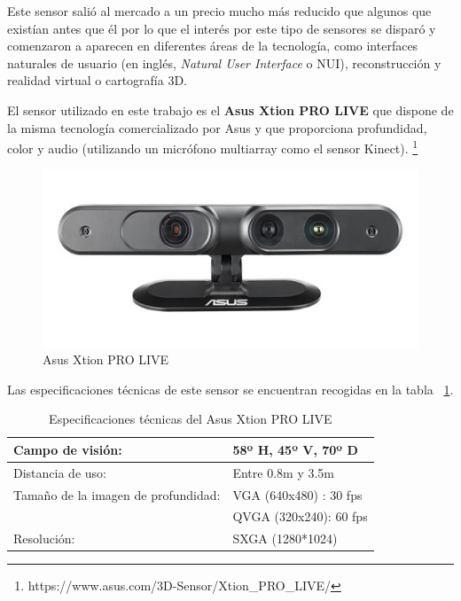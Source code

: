 Este sensor salió al mercado a un precio mucho más reducido que algunos que existían antes que él por lo que el interés por este tipo de sensores se disparó y comenzaron a aparecen en diferentes áreas de la tecnología, como interfaces naturales de usuario (en inglés, \textit{Natural User Interface} o NUI), reconstrucción y realidad virtual o cartografía 3D.

El sensor utilizado en este trabajo es el \textbf{Asus Xtion PRO LIVE} que dispone de la misma tecnología comercializado por Asus y que proporciona profundidad, color y audio (utilizando un micrófono multiarray como el sensor Kinect). \footnote{https://www.asus.com/3D-Sensor/Xtion\_PRO\_LIVE/}

\begin{figure}[th]
\centering
\includegraphics[scale=0.85]{Figures/xtion-pro-live.jpg}
\decoRule
\caption[Sensor Xtion]{Asus Xtion PRO LIVE}
\label{fig:Xtion}
\end{figure}

Las especificaciones técnicas de este sensor se encuentran recogidas en la tabla ~\ref{tab:xtion}.

\begin{table}[h]
\caption{Especificaciones técnicas del Asus Xtion PRO LIVE}
\label{tab:xtion}
\centering
\begin{tabular}{ l | l }
\toprule
Campo de visión: & 58º H, 45º V, 70º D\\
\hline
Distancia de uso: & Entre 0.8m y 3.5m\\
\hline
Tamaño de la imagen de profundidad: & VGA (640x480) : 30 fps \\
				& QVGA (320x240): 60 fps\\
\hline
Resolución: & SXGA (1280*1024) \\
\bottomrule
\end{tabular}
\end{table}


